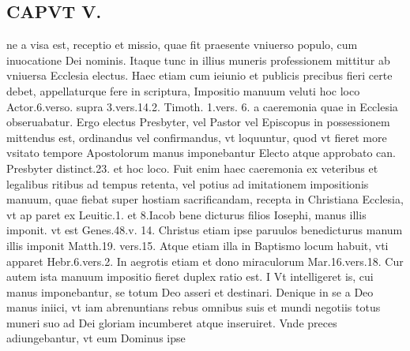 \documentclass{article}
\begin{document}
\begin{pages}
\section*{CAPVT  V. }
\marginpar{[ p.359 ]}\pstart ne a visa est, receptio et missio, quae fit praesente vniuerso populo, cum inuocatione Dei nominis. Itaque tunc in illius muneris professionem mittitur ab vniuersa Ecclesia electus. Haec etiam cum ieiunio et publicis precibus fieri certe debet, appellaturque fere in scriptura, Impositio manuum veluti hoc loco Actor.6.verso. supra 3.vers.14.2. Timoth. 1.vers. 6. a caeremonia quae in Ecclesia obseruabatur. Ergo electus Presbyter, vel Pastor vel Episcopus in possessionem mittendus est, ordinandus vel confirmandus, vt loquuntur, quod vt fieret more vsitato tempore Apostolorum manus imponebantur Electo atque approbato can. Presbyter distinct.23. et hoc loco. Fuit enim haec caeremonia ex veteribus et legalibus ritibus ad tempus retenta, vel potius ad imitationem impositionis manuum, quae fiebat super hostiam sacrificandam, recepta in Christiana Ecclesia, vt ap paret ex Leuitic.1. et 8.Iacob bene dicturus filios Iosephi, manus illis imponit. vt est Genes.48.v. 14. Christus etiam ipse paruulos benedicturus manum illis imponit Matth.19. vers.15. Atque etiam illa in Baptismo locum habuit, vti apparet Hebr.6.vers.2. In aegrotis etiam et dono miraculorum Mar.16.vers.18. Cur autem ista manuum impositio fieret duplex ratio est. I Vt intelligeret is, cui manus imponebantur, se totum Deo asseri et destinari. Denique in se a Deo manus iniici, vt iam abrenuntians rebus omnibus suis et mundi negotiis totus muneri suo ad Dei gloriam incumberet atque inseruiret. Vnde preces adiungebantur, vt eum Dominus ipse  \pend

\end{pages}
\end{document}
